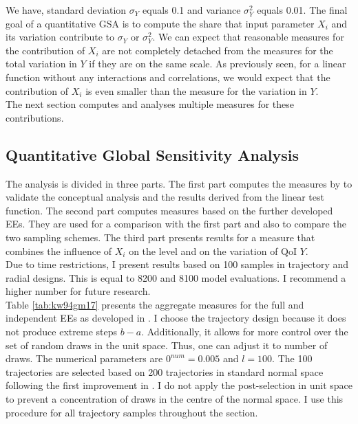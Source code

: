 \documentclass[a4paper,12pt]{article}
\begin{document}
\noindent
We have, standard deviation $\sigma_Y$ equals 0.1 and variance $\sigma_Y^2$ equals 0.01. The final goal of a quantitative GSA is to compute the share that input parameter $X_i$ and its variation contribute to $\sigma_Y$ or $\sigma_Y^2$. We can expect that reasonable measures for the contribution of $X_i$ are not completely detached from the measures for the total variation in $Y$ if they are on the same scale. As previously seen, for a linear function without any interactions and correlations, we would expect that the contribution of $X_i$ is even smaller than the measure for the variation in $Y$.\\


\noindent
The next section computes and analyses multiple measures for these contributions.


\subsection{Quantitative Global Sensitivity Analysis}

The analysis is divided in three parts. The first part computes the measures by \cite{ge2017extending} to validate the conceptual analysis and the results derived from the linear test function. The second part computes measures based on the further developed EEs. They are used for a comparison with the first part and also to compare the two sampling schemes. The third part presents results for a measure that combines the influence of $X_i$ on the level and on the variation of QoI $Y$.\\

\noindent
Due to time restrictions, I present results based on 100 samples in trajectory and radial designs. This is equal to 8200 and 8100 model evaluations. I recommend a higher number for future research.\\

\noindent
Table \ref{tab:kw94gm17} presents the aggregate measures for the full and independent EEs as developed in \cite{ge2014efficient}. I choose the trajectory design because it does not produce extreme steps $b-a$. Additionally, it allows for more control over the set of random draws in the unit space. Thus, one can adjust it to number of draws. The numerical parameters are $0^{num}=0.005$ and $l=100$. The 100 trajectories are selected based on 200 trajectories in standard normal space following the first improvement in \cite{ge2014efficient}. I do not apply the post-selection in unit space to prevent a concentration of draws in the centre of the normal space. I use this procedure for all trajectory samples throughout the section.\\
\end{document}
